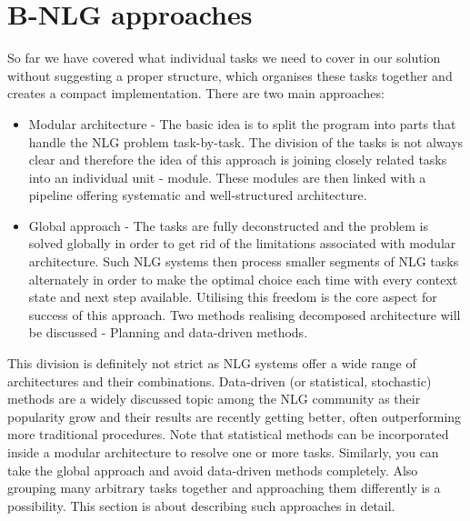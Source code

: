 \chapter{B-NLG approaches}\label{chap:approaches}
So far we have covered what individual tasks we need to cover in our solution without suggesting a proper structure, which organises these tasks together and creates a compact implementation. There are two main approaches:
\begin{itemize}
	\item Modular architecture - The basic idea is to split the program into parts that handle the NLG problem task-by-task. The division of the tasks is not always clear and therefore the idea of this approach is joining closely related tasks into an individual unit - module. These modules are then linked with a pipeline offering systematic and well-structured architecture.
	\item Global approach - The tasks are fully deconstructed and the problem is solved globally in order to get rid of the limitations associated with modular architecture. Such NLG systems then process smaller segments of NLG tasks alternately in order to make the optimal choice each time with every context state and next step available. Utilising this freedom is the core aspect for success of this approach. Two methods realising decomposed architecture will be discussed - Planning and data-driven methods.
\end{itemize}

This division is definitely not strict as NLG systems offer a wide range of architectures and their combinations. Data-driven (or statistical,  stochastic) methods are a widely discussed topic among the NLG community as their popularity grow and their results are recently getting better, often outperforming more traditional procedures. Note that statistical methods can be incorporated inside a modular architecture to resolve one or more tasks. Similarly, you can take the global approach and avoid data-driven methods completely. Also grouping many arbitrary tasks together and approaching them differently is a possibility. This section is about describing such approaches in detail.

